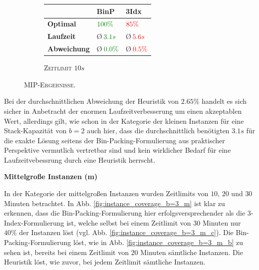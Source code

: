 \begin{figure}[H]
\begin{subfigure}[b]{0.3\textwidth}
{\begin{tabular}{ | l | l | l |}
    \hline
     & \textbf{BinP} & \textbf{3Idx} \\ \hline
    \textbf{Optimal} & $ \textcolor{mygreen}{100 \%}$ & $ \textcolor{red}{85 \%}$ \\ \hline
    \textbf{Laufzeit} & \O $\thinspace \textcolor{mygreen}{3.1 s}$ & \O $\thinspace \textcolor{red}{5.6 s}$ \\ \hline
    \textbf{Abweichung} & \O $\thinspace \textcolor{mygreen}{0.0 \%}$ & \O $\thinspace \textcolor{red}{0.5 \%}$ \\ \hline
\end{tabular}}
\caption{\textsc{Zeitlimit} $10s$}
\label{}
\end{subfigure}
\caption{\textsc{MIP-Ergebnisse.}}
\label{fig:mip_results_b=3_s}
\end{figure}

Bei der durchschnittlichen Abweichung der Heuristik von $2.65 \%$ handelt es sich sicher in Anbetracht
der enormen Laufzeitverbesserung um einen akzeptablen Wert, allerdings gilt, wie schon in der Kategorie
der kleinen Instanzen für eine Stack-Kapazität von $b = 2$ auch hier, dass die durchschnittlich benötigten $3.1s$
für die exakte Lösung seitens der Bin-Packing-Formulierung aus praktischer Perspektive vermutlich vertretbar sind
und kein wirklicher Bedarf für eine Laufzeitvebessrung durch eine Heuristik herrscht.

\textbf{Mittelgroße Instanzen (m)}

In der Kategorie der mittelgroßen Instanzen wurden Zeitlimits von $10$, $20$ und $30$ Minuten betrachtet.
In Abb. \ref{fig:instance_coverage_b=3_m} ist klar zu erkennen, dass die Bin-Packing-Formulierung hier erfolgsversprechender
als die 3-Index-Formulierung ist, welche selbst bei einem Zeitlimit von $30$ Minuten nur $40 \%$ der Instanzen löst
(vgl. Abb. \ref{fig:instance_coverage_b=3_m_c}). Die Bin-Packing-Formulierung löst, wie in Abb. \ref{fig:instance_coverage_b=3_m_b} zu sehen
ist, bereits bei einem Zeitlimit von $20$ Minuten sämtliche Instanzen.
Die Heuristik löst, wie zuvor, bei jedem Zeitlimit sämtliche Instanzen.


